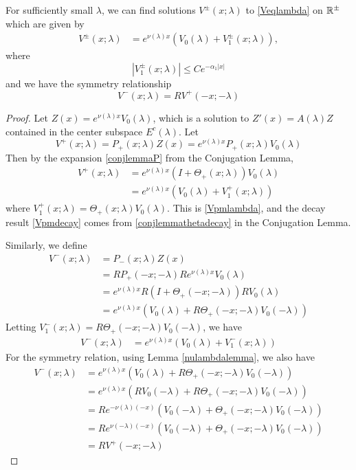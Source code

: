 \documentclass[thesis.tex]{subfiles}
\begin{document}
\begin{lemma}\label{centersolutionslemma}
For sufficiently small $\lambda$, we can find solutions $V^\pm(x; \lambda)$ to \eqref{Veqlambda} on $\mathbb{R}^\pm$ which are given by
\begin{align}\label{Vpmlambda}
V^\pm(x; \lambda) &= e^{\nu(\lambda)x}(V_0(\lambda) + V_1^\pm(x; \lambda)),
\end{align}
where
\begin{equation}\label{Vpmdecay}
|V_1^\pm(x; \lambda)| \leq C e^{-\alpha_1 |x|}
\end{equation}
and we have the symmetry relationship
\begin{equation}\label{Vpmsymmetry}
V^-(x; \lambda) = R V^+(-x; -\lambda)
\end{equation}

\begin{proof}
Let $Z(x) = e^{\nu(\lambda)x}V_0(\lambda)$, which is a solution to $Z'(x) = A(\lambda)Z$ contained in the center subspace $E^c(\lambda)$. Let
\[
V^+(x; \lambda) = P_+(x; \lambda) Z(x) = e^{\nu(\lambda)x}P_+(x; \lambda)V_0(\lambda)
\]
Then by the expansion \eqref{conjlemmaP} from the Conjugation Lemma,
\begin{align*}
V^+(x; \lambda) &= e^{\nu(\lambda)x}(I + \Theta_+(x; \lambda))V_0(\lambda) \\
&= e^{\nu(\lambda)x}( V_0(\lambda) + V_1^+(x; \lambda))
\end{align*}
where $V_1^+(x; \lambda) = \Theta_+(x; \lambda) V_0(\lambda)$. This is \eqref{Vpmlambda}, and the decay result \eqref{Vpmdecay} comes from \eqref{conjlemmathetadecay} in the Conjugation Lemma.

Similarly, we define 
\begin{align*}
V^-(x; \lambda) &= P_-(x; \lambda) Z(x) \\
&= RP_+(-x; -\lambda)R e^{\nu(\lambda)x} V_0(\lambda) \\
&= e^{\nu(\lambda)x} R(I + \Theta_+(-x; -\lambda))R V_0(\lambda) \\
&= e^{\nu(\lambda)x}( V_0(\lambda) + R\Theta_+(-x; -\lambda) V_0(-\lambda) )
\end{align*}
Letting $V_1^-(x; \lambda) = R\Theta_+(-x; -\lambda) V_0(-\lambda)$, we have
\begin{align*}
V^-(x; \lambda) &= e^{\nu(\lambda)x}( V_0(\lambda) + V_1^-(x; \lambda))
\end{align*}
For the symmetry relation, using Lemma \ref{nulambdalemma}, we also have
\begin{align*}
V^-(x; \lambda) &= e^{\nu(\lambda)x}( V_0(\lambda) + R\Theta_+(-x; -\lambda) V_0(-\lambda) ) \\
&= e^{\nu(\lambda)x}( R V_0(-\lambda) + R\Theta_+(-x; -\lambda) V_0(-\lambda) ) \\
&= R e^{-\nu(\lambda)(-x)}( V_0(-\lambda) + \Theta_+(-x; -\lambda) V_0(-\lambda) ) \\
&= R e^{\nu(-\lambda)(-x)}( V_0(-\lambda) + \Theta_+(-x; -\lambda) V_0(-\lambda) ) \\
&= R V^+(-x; -\lambda)
\end{align*}
\end{proof}
\end{lemma}
\end{document}
